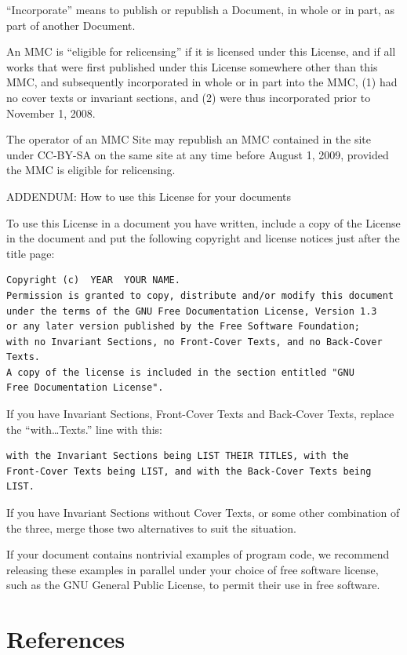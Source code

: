 \documentclass[12pt,a4paperpaper,]{report}
\begin{document}
``Incorporate'' means to publish or republish a Document, in whole or in
part, as part of another Document.

An MMC is ``eligible for relicensing'' if it is licensed under this
License, and if all works that were first published under this License
somewhere other than this MMC, and subsequently incorporated in whole or
in part into the MMC, (1) had no cover texts or invariant sections, and
(2) were thus incorporated prior to November 1, 2008.

The operator of an MMC Site may republish an MMC contained in the site
under CC-BY-SA on the same site at any time before August 1, 2009,
provided the MMC is eligible for relicensing.

ADDENDUM: How to use this License for your documents

To use this License in a document you have written, include a copy of
the License in the document and put the following copyright and license
notices just after the title page:

\begin{verbatim}
Copyright (c)  YEAR  YOUR NAME.
Permission is granted to copy, distribute and/or modify this document
under the terms of the GNU Free Documentation License, Version 1.3
or any later version published by the Free Software Foundation;
with no Invariant Sections, no Front-Cover Texts, and no Back-Cover Texts.
A copy of the license is included in the section entitled "GNU
Free Documentation License".
\end{verbatim}

If you have Invariant Sections, Front-Cover Texts and Back-Cover Texts,
replace the ``with\ldots{}Texts.'' line with this:

\begin{verbatim}
with the Invariant Sections being LIST THEIR TITLES, with the
Front-Cover Texts being LIST, and with the Back-Cover Texts being LIST.
\end{verbatim}

If you have Invariant Sections without Cover Texts, or some other
combination of the three, merge those two alternatives to suit the
situation.

If your document contains nontrivial examples of program code, we
recommend releasing these examples in parallel under your choice of free
software license, such as the GNU General Public License, to permit
their use in free software.

\footnotesize

\chapter*{References}\label{references}
\end{document}
